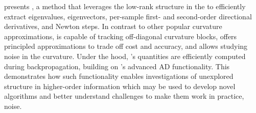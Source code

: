 presents \vivit, a method that leverages the low-rank structure in the \ggn to
efficiently extract eigenvalues, eigenvectors, per-sample first- and
second-order directional derivatives, and Newton steps. In contrast to other
popular curvature approximations, \vivit is capable of tracking off-diagonal
curvature blocks, offers principled approximations to trade off cost and
accuracy, and allows studying noise in the curvature. Under the hood, \vivit's
quantities are efficiently computed during backpropagation, building on
\backpack's advanced AD functionality. This demonstrates how such functionality
enables investigations of unexplored structure in higher-order information which
may be used to develop novel algorithms and better understand challenges to make
them work in practice, \eg noise.

